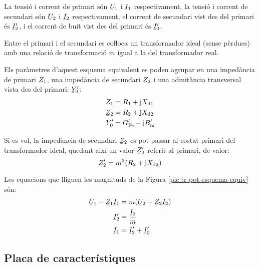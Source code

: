 La tensió i corrent de primari són $\cmplx{U}_1$ i $\cmplx{I}_1$ respectivament, la tensió i corrent de secundari són $\cmplx{U}_2$ i $\cmplx{I}_2$ respectivament, el corrent de secundari vist des del primari és $\cmplx{I}_2'$, i el corrent de buit vist des del primari és $\cmplx{I}_0'$.

Entre el primari i el secundari es coŀloca un transformador ideal (sense pèrdues) amb una relació de transformació $m$ igual a la del transformador real.

Els paràmetres d'aquest esquema equivalent es poden agrupar en una impedància de primari $\cmplx{Z}_1$, una impedància de secundari $\cmplx{Z}_2$ i una  admitància transversal vista des del primari: $\cmplx{Y}_0'$:
\begin{align}
    \cmplx{Z}_1 &= R_1 + \ju X\ped{d1} \\
    \cmplx{Z}_2 &= R_2 + \ju X\ped{d2}\\
    \cmplx{Y}_0' &= G\ped{Fe}'- \ju B\ped{m}'
\end{align}

Si es vol, la impedància de secundari $\cmplx{Z}_2$ es pot passar al costat primari del transformador ideal, quedant així un valor $\cmplx{Z}_2'$ referit al primari, de valor:
\begin{equation}
    \cmplx{Z}_2' = m^2 (R_2 + \ju X\ped{d2})
\end{equation}

Les equacions que lliguen les magnituds de la Figura \vref{pic:tr-pot-esquema-equiv} són:
\begin{align}
    \cmplx{U}_1 - \cmplx{Z}_1 \cmplx{I}_1 &= m ( \cmplx{U}_2  + \cmplx{Z}_2 \cmplx{I}_2 ) \\
    \cmplx{I}_2' &=   \frac{\cmplx{I}_2}{m} \\
    \cmplx{I}_1  &=   \cmplx{I}_2' + \cmplx{I}_0'
\end{align}


\subsection{Placa de característiques}

